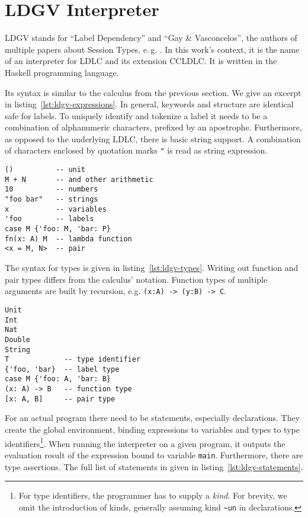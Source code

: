 \section{LDGV Interpreter}

LDGV stands for ``Label Dependency'' and ``Gay \& Vasconcelos'', the authors of multiple papers about Session Types, e.\,g. \cite{gayvasconcelos2010}. In this work's context, it is the name of an interpreter for LDLC and its extension CCLDLC. It is written in the Haskell programming language.

Its syntax is similar to the calculus from the previous section. We give an excerpt in listing~\ref{lst:ldgv-expressions}. In general, keywords and structure are identical safe for labels. To uniquely identify and tokenize a label it needs to be a combination of alphanumeric characters, prefixed by an apostrophe. Furthermore, as opposed to the underlying LDLC, there is basic string support. A combination of characters enclosed by quotation marks \texttt{"} is read as string expression.

\begin{lstlisting}[float,language=ldgv,
  caption={LDGV: Expressions (excerpt) with expressions \texttt{M,N,P}, variable \texttt{x} and type \texttt{A}},
  label=lst:ldgv-expressions]
()          -- unit
M + N       -- and other arithmetic
10          -- numbers
"foo bar"   -- strings
x           -- variables
'foo        -- labels
case M {'foo: M, 'bar: P}
fn(x: A) M  -- lambda function
<x = M, N>  -- pair
\end{lstlisting}

The syntax for types is given in listing~\ref{lst:ldgv-types}. Writing out function and pair types differs from the calculus' notation. Function types of multiple arguments are built by recursion, e.g. \texttt{(x:A) -> (y:B) -> C}.

\begin{lstlisting}[float,language=ldgv,
  caption={LDGV: Types (excerpt) with expression \texttt{M}, variable \texttt{x}, type identifier \texttt{T} and types \texttt{A,B}},
  label=lst:ldgv-types]
Unit
Int
Nat
Double
String
T             -- type identifier
{'foo, 'bar}  -- label type
case M {'foo: A, 'bar: B}
(x: A) -> B   -- function type
[x: A, B]     -- pair type
\end{lstlisting}

For an actual program there need to be statements, especially declarations. They create the global environment, binding expressions to variables and types to type identifiers\footnote{For type identifiers, the programmer has to supply a \emph{kind}. For brevity, we omit the introduction of kinds, generally assuming kind \texttt{\textasciitilde un} in declarations.}. When running the interpreter on a given program, it outputs the evaluation result of the expression bound to variable \texttt{main}. Furthermore, there are type assertions. The full list of statements in given in listing~\ref{lst:ldgv-statements}.

